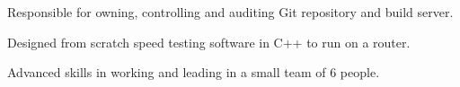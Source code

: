 \documentclass[letterpaper]{deedy-resume} %
\begin{document}
\begin{minipage}[t]{0.66\textwidth}
\sectionspace %

%

\vspace{\topsep} %
\begin{tightitemize}
\item Responsible for owning, controlling and auditing Git repository and build server.
\item Designed from scratch speed testing software in C++ to run on a router.
\item Advanced skills in working and leading in a small team of 6 people.
\end{tightitemize}
\vspace{\topsep} %

\sectionspace %


\end{minipage} %








\end{document}
